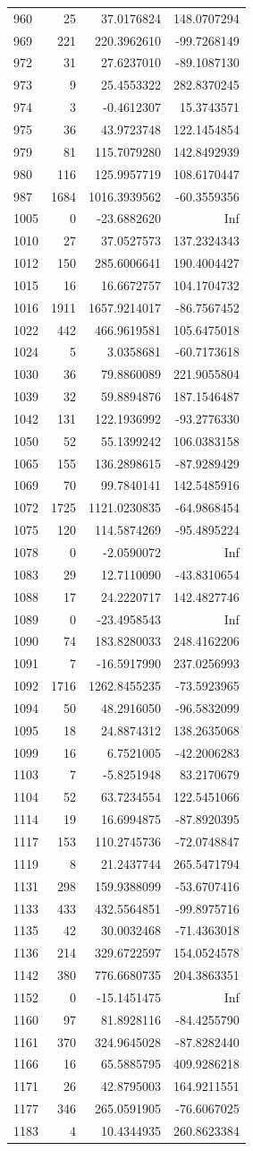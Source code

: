 \documentclass[
]{article}
\begin{document}
\begin{longtable}[]{@{}lrrr@{}}
960 & 25 & 37.0176824 & 148.0707294\tabularnewline
969 & 221 & 220.3962610 & -99.7268149\tabularnewline
972 & 31 & 27.6237010 & -89.1087130\tabularnewline
973 & 9 & 25.4553322 & 282.8370245\tabularnewline
974 & 3 & -0.4612307 & 15.3743571\tabularnewline
975 & 36 & 43.9723748 & 122.1454854\tabularnewline
979 & 81 & 115.7079280 & 142.8492939\tabularnewline
980 & 116 & 125.9957719 & 108.6170447\tabularnewline
987 & 1684 & 1016.3939562 & -60.3559356\tabularnewline
1005 & 0 & -23.6882620 & Inf\tabularnewline
1010 & 27 & 37.0527573 & 137.2324343\tabularnewline
1012 & 150 & 285.6006641 & 190.4004427\tabularnewline
1015 & 16 & 16.6672757 & 104.1704732\tabularnewline
1016 & 1911 & 1657.9214017 & -86.7567452\tabularnewline
1022 & 442 & 466.9619581 & 105.6475018\tabularnewline
1024 & 5 & 3.0358681 & -60.7173618\tabularnewline
1030 & 36 & 79.8860089 & 221.9055804\tabularnewline
1039 & 32 & 59.8894876 & 187.1546487\tabularnewline
1042 & 131 & 122.1936992 & -93.2776330\tabularnewline
1050 & 52 & 55.1399242 & 106.0383158\tabularnewline
1065 & 155 & 136.2898615 & -87.9289429\tabularnewline
1069 & 70 & 99.7840141 & 142.5485916\tabularnewline
1072 & 1725 & 1121.0230835 & -64.9868454\tabularnewline
1075 & 120 & 114.5874269 & -95.4895224\tabularnewline
1078 & 0 & -2.0590072 & Inf\tabularnewline
1083 & 29 & 12.7110090 & -43.8310654\tabularnewline
1088 & 17 & 24.2220717 & 142.4827746\tabularnewline
1089 & 0 & -23.4958543 & Inf\tabularnewline
1090 & 74 & 183.8280033 & 248.4162206\tabularnewline
1091 & 7 & -16.5917990 & 237.0256993\tabularnewline
1092 & 1716 & 1262.8455235 & -73.5923965\tabularnewline
1094 & 50 & 48.2916050 & -96.5832099\tabularnewline
1095 & 18 & 24.8874312 & 138.2635068\tabularnewline
1099 & 16 & 6.7521005 & -42.2006283\tabularnewline
1103 & 7 & -5.8251948 & 83.2170679\tabularnewline
1104 & 52 & 63.7234554 & 122.5451066\tabularnewline
1114 & 19 & 16.6994875 & -87.8920395\tabularnewline
1117 & 153 & 110.2745736 & -72.0748847\tabularnewline
1119 & 8 & 21.2437744 & 265.5471794\tabularnewline
1131 & 298 & 159.9388099 & -53.6707416\tabularnewline
1133 & 433 & 432.5564851 & -99.8975716\tabularnewline
1135 & 42 & 30.0032468 & -71.4363018\tabularnewline
1136 & 214 & 329.6722597 & 154.0524578\tabularnewline
1142 & 380 & 776.6680735 & 204.3863351\tabularnewline
1152 & 0 & -15.1451475 & Inf\tabularnewline
1160 & 97 & 81.8928116 & -84.4255790\tabularnewline
1161 & 370 & 324.9645028 & -87.8282440\tabularnewline
1166 & 16 & 65.5885795 & 409.9286218\tabularnewline
1171 & 26 & 42.8795003 & 164.9211551\tabularnewline
1177 & 346 & 265.0591905 & -76.6067025\tabularnewline
1183 & 4 & 10.4344935 & 260.8623384\tabularnewline

\end{longtable}
\end{document}
